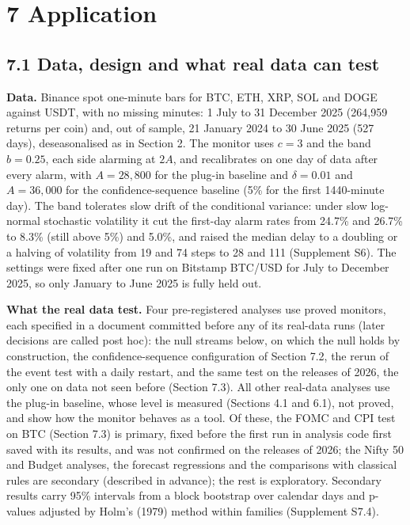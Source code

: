 \documentclass[
]{article}
\begin{document}
\hypertarget{application}{%
\section{7 Application}\label{application}}

\hypertarget{data-design-and-what-real-data-can-test}{%
\subsection{7.1 Data, design and what real data can
test}\label{data-design-and-what-real-data-can-test}}

\textbf{Data.} Binance spot one-minute bars for BTC, ETH, XRP, SOL and
DOGE against USDT, with no missing minutes: 1 July to 31 December 2025
(264,959 returns per coin) and, out of sample, 21 January 2024 to 30
June 2025 (527 days), deseasonalised as in Section 2. The monitor uses
\(c = 3\) and the band \(b = 0.25\), each side alarming at \(2A\), and
recalibrates on one day of data after every alarm, with \(A = 28{,}800\)
for the plug-in baseline and \(\delta = 0.01\) and \(A = 36{,}000\) for
the confidence-sequence baseline (5\% for the first 1440-minute day).
The band tolerates slow drift of the conditional variance: under slow
log-normal stochastic volatility it cut the first-day alarm rates from
24.7\% and 26.7\% to 8.3\% (still above 5\%) and 5.0\%, and raised the
median delay to a doubling or a halving of volatility from 19 and 74
steps to 28 and 111 (Supplement S6). The settings were fixed after one
run on Bitstamp BTC/USD for July to December 2025, so only January to
June 2025 is fully held out.

\textbf{What the real data test.} Four pre-registered analyses use
proved monitors, each specified in a document committed before any of
its real-data runs (later decisions are called post hoc): the null
streams below, on which the null holds by construction, the
confidence-sequence configuration of Section 7.2, the rerun of the event
test with a daily restart, and the same test on the releases of 2026,
the only one on data not seen before (Section 7.3). All other real-data
analyses use the plug-in baseline, whose level is measured (Sections 4.1
and 6.1), not proved, and show how the monitor behaves as a tool. Of
these, the FOMC and CPI test on BTC (Section 7.3) is primary, fixed
before the first run in analysis code first saved with its results, and
was not confirmed on the releases of 2026; the Nifty 50 and Budget
analyses, the forecast regressions and the comparisons with classical
rules are secondary (described in advance); the rest is exploratory.
Secondary results carry 95\% intervals from a block bootstrap over
calendar days and p-values adjusted by Holm's (1979) method within
families (Supplement S7.4).
\end{document}
